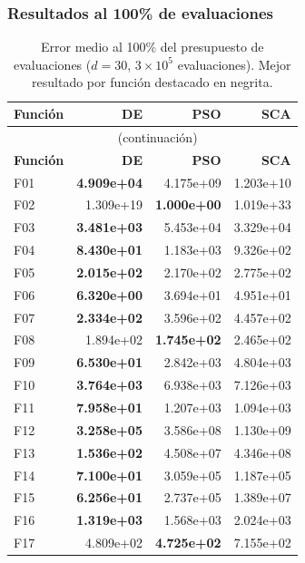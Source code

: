 \documentclass[12pt,a4paper]{article}
\begin{document}
\subsubsection{Resultados al 100\% de evaluaciones}
 
\begin{longtable}{lrrr}
\caption{Error medio al 100\% del presupuesto de evaluaciones ($d=30$, $3\times10^5$ evaluaciones). Mejor resultado por función destacado en negrita.}
\label{tab:resultados_final_d30}\\
\toprule
\textbf{Función} & \textbf{DE} & \textbf{PSO} & \textbf{SCA} \\
\midrule
\endfirsthead
\multicolumn{4}{c}{\tablename~\thetable{} (continuación)}\\
\toprule
\textbf{Función} & \textbf{DE} & \textbf{PSO} & \textbf{SCA} \\
\midrule
\endhead
\midrule
\endfoot
\bottomrule
\endlastfoot
F01  & \textbf{4.909e+04} & 4.175e+09 & 1.203e+10 \\
F02  & 1.309e+19 & \textbf{1.000e+00} & 1.019e+33 \\
F03  & \textbf{3.481e+03} & 5.453e+04 & 3.329e+04 \\
F04  & \textbf{8.430e+01} & 1.183e+03 & 9.326e+02 \\
F05  & \textbf{2.015e+02} & 2.170e+02 & 2.775e+02 \\
F06  & \textbf{6.320e+00} & 3.694e+01 & 4.951e+01 \\
F07  & \textbf{2.334e+02} & 3.596e+02 & 4.457e+02 \\
F08  & 1.894e+02 & \textbf{1.745e+02} & 2.465e+02 \\
F09  & \textbf{6.530e+01} & 2.842e+03 & 4.804e+03 \\
F10  & \textbf{3.764e+03} & 6.938e+03 & 7.126e+03 \\
F11  & \textbf{7.958e+01} & 1.207e+03 & 1.094e+03 \\
F12  & \textbf{3.258e+05} & 3.586e+08 & 1.130e+09 \\
F13  & \textbf{1.536e+02} & 4.508e+07 & 4.346e+08 \\
F14  & \textbf{7.100e+01} & 3.059e+05 & 1.187e+05 \\
F15  & \textbf{6.256e+01} & 2.737e+05 & 1.389e+07 \\
F16  & \textbf{1.319e+03} & 1.568e+03 & 2.024e+03 \\
F17  & 4.809e+02 & \textbf{4.725e+02} & 7.155e+02 \\

\end{longtable}
\end{document}
